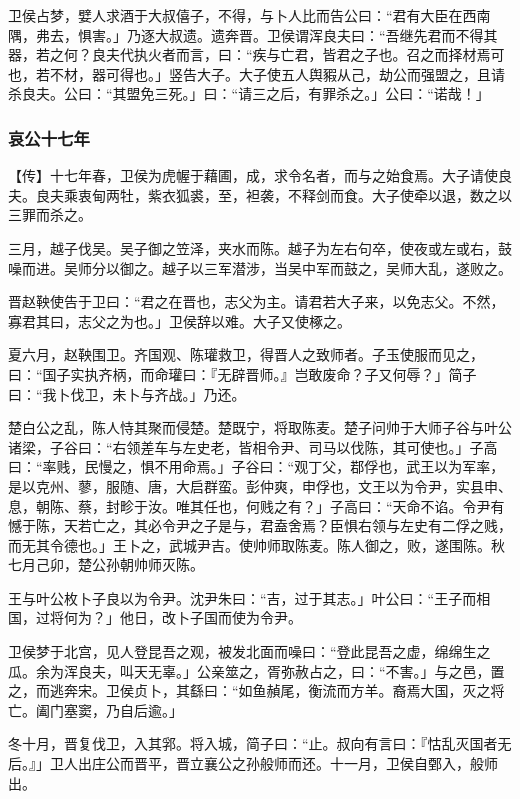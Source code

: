 \documentclass[]{article}
\begin{document}
卫侯占梦，嬖人求酒于大叔僖子，不得，与卜人比而告公曰：``君有大臣在西南隅，弗去，惧害。」乃逐大叔遗。遗奔晋。卫侯谓浑良夫曰：``吾继先君而不得其器，若之何？良夫代执火者而言，曰：``疾与亡君，皆君之子也。召之而择材焉可也，若不材，器可得也。」竖告大子。大子使五人舆豭从己，劫公而强盟之，且请杀良夫。公曰：``其盟免三死。」曰：``请三之后，有罪杀之。」公曰：``诺哉！」

\hypertarget{header-n3228}{%
\subsubsection{哀公十七年}\label{header-n3228}}

【传】十七年春，卫侯为虎幄于藉圃，成，求令名者，而与之始食焉。大子请使良夫。良夫乘衷甸两牡，紫衣狐裘，至，袒袭，不释剑而食。大子使牵以退，数之以三罪而杀之。

三月，越子伐吴。吴子御之笠泽，夹水而陈。越子为左右句卒，使夜或左或右，鼓噪而进。吴师分以御之。越子以三军潜涉，当吴中军而鼓之，吴师大乱，遂败之。

晋赵鞅使告于卫曰：``君之在晋也，志父为主。请君若大子来，以免志父。不然，寡君其曰，志父之为也。」卫侯辞以难。大子又使椓之。

夏六月，赵鞅围卫。齐国观、陈瓘救卫，得晋人之致师者。子玉使服而见之，曰：``国子实执齐柄，而命瓘曰：『无辟晋师。』岂敢废命？子又何辱？」简子曰：``我卜伐卫，未卜与齐战。」乃还。

楚白公之乱，陈人恃其聚而侵楚。楚既宁，将取陈麦。楚子问帅于大师子谷与叶公诸梁，子谷曰：``右领差车与左史老，皆相令尹、司马以伐陈，其可使也。」子高曰：``率贱，民慢之，惧不用命焉。」子谷曰：``观丁父，鄀俘也，武王以为军率，是以克州、蓼，服随、唐，大启群蛮。彭仲爽，申俘也，文王以为令尹，实县申、息，朝陈、蔡，封畛于汝。唯其任也，何贱之有？」子高曰：``天命不谄。令尹有憾于陈，天若亡之，其必令尹之子是与，君盍舍焉？臣惧右领与左史有二俘之贱，而无其令德也。」王卜之，武城尹吉。使帅师取陈麦。陈人御之，败，遂围陈。秋七月己卯，楚公孙朝帅师灭陈。

王与叶公枚卜子良以为令尹。沈尹朱曰：``吉，过于其志。」叶公曰：``王子而相国，过将何为？」他日，改卜子国而使为令尹。

卫侯梦于北宫，见人登昆吾之观，被发北面而噪曰：``登此昆吾之虚，绵绵生之瓜。余为浑良夫，叫天无辜。」公亲筮之，胥弥赦占之，曰：``不害。」与之邑，置之，而逃奔宋。卫侯贞卜，其繇曰：``如鱼赬尾，衡流而方羊。裔焉大国，灭之将亡。阖门塞窦，乃自后逾。」

冬十月，晋复伐卫，入其郛。将入城，简子曰：``止。叔向有言曰：『怙乱灭国者无后。』」卫人出庄公而晋平，晋立襄公之孙般师而还。十一月，卫侯自鄄入，般师出。
\end{document}
